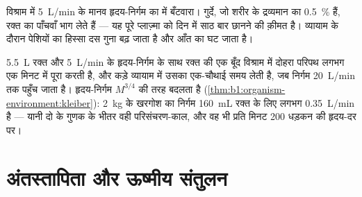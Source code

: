 \begin{omfigure}

{\small विश्राम में \qty{5}{L/min} के मानव हृदय-निर्गम का  में
बँटवारा। गुर्दे, जो शरीर के द्रव्यमान का \qty{0.5}{\%} हैं, रक्त का
पाँचवाँ भाग लेते हैं --- यह पूरे प्लाज़्मा को दिन में साठ बार छानने की
क़ीमत है। व्यायाम के दौरान पेशियों का हिस्सा दस गुना बढ़ जाता है और आँत
का घट जाता है।}
\end{omfigure}

\begin{example}[परिसंचरण-काल]\label{ex:b1:mammal-organization:circtime}
\qty{5.5}{L} रक्त और \qty{5}{L/min} के हृदय-निर्गम के साथ रक्त की एक
बूँद विश्राम में दोहरा परिपथ लगभग एक मिनट में पूरा करती है, और कड़े
व्यायाम में उसका एक-चौथाई समय लेती है, जब निर्गम \qty{20}{L/min} तक
पहुँच जाता है। हृदय-निर्गम $M^{3/4}$ की तरह बदलता है
(\cref{thm:b1:organism-environment:kleiber}): \qty{2}{kg} के खरगोश का
निर्गम \qty{160}{mL} रक्त के लिए लगभग \qty{0.35}{L/min} है --- यानी दो
के गुणक के भीतर वही परिसंचरण-काल, और वह भी प्रति मिनट \qty{200}{} धड़कन
की हृदय-दर पर।
\end{example}

\section{अंतस्तापिता और ऊष्मीय संतुलन}

